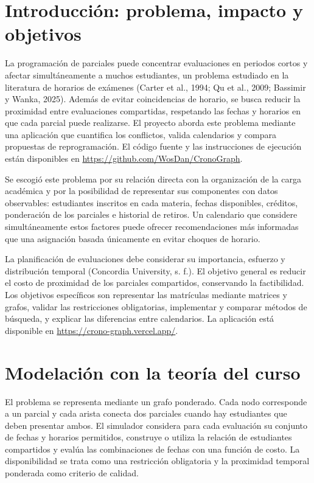 \documentclass[12pt,letterpaper]{article}
\begin{document}
\newpage
\section{Introducción: problema, impacto y objetivos}
La programación de parciales puede concentrar evaluaciones en periodos cortos y afectar simultáneamente a muchos estudiantes, un problema estudiado en la literatura de horarios de exámenes (Carter et al., 1994; Qu et al., 2009; Bassimir y Wanka, 2025). Además de evitar coincidencias de horario, se busca reducir la proximidad entre evaluaciones compartidas, respetando las fechas y horarios en que cada parcial puede realizarse. El proyecto aborda este problema mediante una aplicación que cuantifica los conflictos, valida calendarios y compara propuestas de reprogramación. El código fuente y las instrucciones de ejecución están disponibles en \url{https://github.com/WosDan/CronoGraph}.

Se escogió este problema por su relación directa con la organización de la carga académica y por la posibilidad de representar sus componentes con datos observables: estudiantes inscritos en cada materia, fechas disponibles, créditos, ponderación de los parciales e historial de retiros. Un calendario que considere simultáneamente estos factores puede ofrecer recomendaciones más informadas que una asignación basada únicamente en evitar choques de horario.

La planificación de evaluaciones debe considerar su importancia, esfuerzo y distribución temporal (Concordia University, s. f.). El objetivo general es reducir el costo de proximidad de los parciales compartidos, conservando la factibilidad. Los objetivos específicos son representar las matrículas mediante matrices y grafos, validar las restricciones obligatorias, implementar y comparar métodos de búsqueda, y explicar las diferencias entre calendarios. La aplicación está disponible en \url{https://crono-graph.vercel.app/}.

\section{Modelación con la teoría del curso}
El problema se representa mediante un grafo ponderado. Cada nodo corresponde a un parcial y cada arista conecta dos parciales cuando hay estudiantes que deben presentar ambos. El simulador considera para cada evaluación su conjunto de fechas y horarios permitidos, construye o utiliza la relación de estudiantes compartidos y evalúa las combinaciones de fechas con una función de costo. La disponibilidad se trata como una restricción obligatoria y la proximidad temporal ponderada como criterio de calidad.
\end{document}

